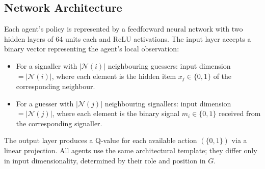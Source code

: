 \documentclass[a4paper,twoside,12pt]{report}
\begin{document}
    
    \subsection{Network Architecture}
    
    Each agent's policy is represented by a feedforward neural network with two
    hidden layers of 64 units each and ReLU activations. The input layer accepts
    a binary vector representing the agent's local observation:
    
    \begin{itemize}
        \item For a signaller with $|\mathcal{N}(i)|$ neighbouring guessers:
        input dimension $= |\mathcal{N}(i)|$, where each element is the
        hidden item $x_j \in \{0,1\}$ of the corresponding neighbour.
    
        \item For a guesser with $|\mathcal{N}(j)|$ neighbouring signallers:
        input dimension $= |\mathcal{N}(j)|$, where each element is the
        binary signal $m_i \in \{0,1\}$ received from the corresponding
        signaller.
    \end{itemize}
    
    The output layer produces a Q-value for each available action
    $(\{0,1\})$ via a linear projection. All agents use the same architectural
    template; they differ only in input dimensionality, determined by their role
    and position in $G$.
    
\end{document}
